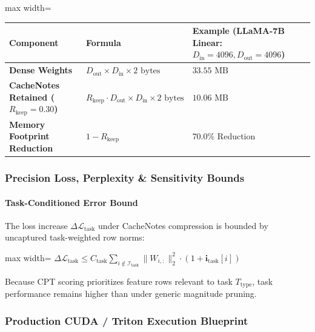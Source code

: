 \begin{center}
\begin{adjustbox}{max width=\columnwidth}
\renewcommand{\arraystretch}{1.2}
\begin{tabular}{lll}
\toprule
Component & Formula & Example (LLaMA-7B Linear: $D_{\text{in}}=4096, D_{\text{out}}=4096$) \\
\midrule
\textbf{Dense Weights} & $D_{\text{out}} \times D_{\text{in}} \times 2 \text{ bytes}$ & $33.55 \text{ MB}$ \\
\textbf{CacheNotes Retained ($R_{\text{keep}}=0.30$)} & $R_{\text{keep}} \cdot D_{\text{out}} \times D_{\text{in}} \times 2 \text{ bytes}$ & $10.06 \text{ MB}$ \\
\textbf{Memory Footprint Reduction} & $1 - R_{\text{keep}}$ & $\mathbf{70.0\%}$ Reduction \\

\bottomrule
\end{tabular}
\end{adjustbox}
\end{center}

\subsubsection*{Precision Loss, Perplexity \& Sensitivity Bounds}

\paragraph{Task-Conditioned Error Bound}

The loss increase $\Delta \mathcal{L}_{\text{task}}$ under CacheNotes compression is bounded by uncaptured task-weighted row norms:

\begin{center}
\begin{adjustbox}{max width=\columnwidth}
$\displaystyle
\Delta \mathcal{L}_{\text{task}} \le C_{\text{task}} \sum_{i \notin \mathcal{I}_{\text{task}}} \| W_{i, :} \|_2^2 \cdot (1 + \mathbf{i}_{\text{task}}[i])
$
\end{adjustbox}
\end{center}

Because CPT scoring prioritizes feature rows relevant to task $T_{\text{type}}$, task performance remains higher than under generic magnitude pruning.


\subsubsection*{Production CUDA / Triton Execution Blueprint}

